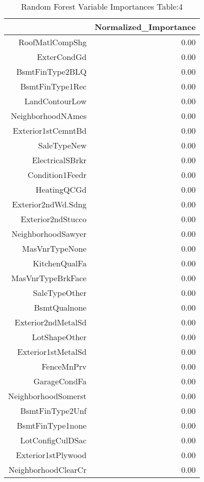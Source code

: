 \begin{table}[ht]
\centering
\begin{tabular}{rr}
  \hline
 & Normalized\_Importance \\ 
  \hline
RoofMatlCompShg & 0.00 \\ 
  ExterCondGd & 0.00 \\ 
  BsmtFinType2BLQ & 0.00 \\ 
  BsmtFinType1Rec & 0.00 \\ 
  LandContourLow & 0.00 \\ 
  NeighborhoodNAmes & 0.00 \\ 
  Exterior1stCemntBd & 0.00 \\ 
  SaleTypeNew & 0.00 \\ 
  ElectricalSBrkr & 0.00 \\ 
  Condition1Feedr & 0.00 \\ 
  HeatingQCGd & 0.00 \\ 
  Exterior2ndWd.Sdng & 0.00 \\ 
  Exterior2ndStucco & 0.00 \\ 
  NeighborhoodSawyer & 0.00 \\ 
  MasVnrTypeNone & 0.00 \\ 
  KitchenQualFa & 0.00 \\ 
  MasVnrTypeBrkFace & 0.00 \\ 
  SaleTypeOther & 0.00 \\ 
  BsmtQualnone & 0.00 \\ 
  Exterior2ndMetalSd & 0.00 \\ 
  LotShapeOther & 0.00 \\ 
  Exterior1stMetalSd & 0.00 \\ 
  FenceMnPrv & 0.00 \\ 
  GarageCondFa & 0.00 \\ 
  NeighborhoodSomerst & 0.00 \\ 
  BsmtFinType2Unf & 0.00 \\ 
  BsmtFinType1none & 0.00 \\ 
  LotConfigCulDSac & 0.00 \\ 
  Exterior1stPlywood & 0.00 \\ 
  NeighborhoodClearCr & 0.00 \\ 
   \hline
\end{tabular}
\caption{Random Forest Variable Importances Table:4} 
\label{tab:importance4}
\end{table}

